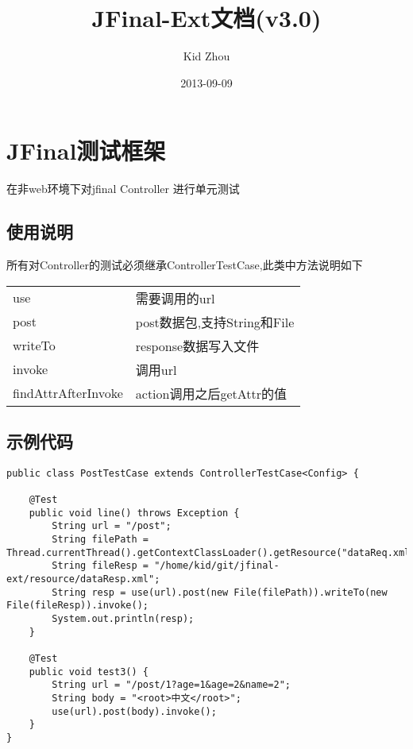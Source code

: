 \documentclass{scrartcl}
\title{JFinal-Ext文档(v3.0)}
\author{Kid Zhou}
\date{2013-09-09}
\begin{document}
\maketitle

\setcounter{tocdepth}{3}
\tableofcontents
\vspace*{1cm}

\section{JFinal测试框架}
\label{sec-1}

  在非web环境下对jfinal Controller 进行单元测试
\subsection{使用说明}
\label{sec-1-1}

 所有对Controller的测试必须继承ControllerTestCase,此类中方法说明如下

\begin{tabular}{ll}
 use                  &  需要调用的url                \\
 post                 &  post数据包,支持String和File  \\
 writeTo              &  response数据写入文件         \\
 invoke               &  调用url                      \\
 findAttrAfterInvoke  &  action调用之后getAttr的值    \\
\end{tabular}
\subsection{示例代码}
\label{sec-1-2}


\begin{verbatim}
public class PostTestCase extends ControllerTestCase<Config> {

    @Test
    public void line() throws Exception {
        String url = "/post";
        String filePath = Thread.currentThread().getContextClassLoader().getResource("dataReq.xml").getFile();
        String fileResp = "/home/kid/git/jfinal-ext/resource/dataResp.xml";
        String resp = use(url).post(new File(filePath)).writeTo(new File(fileResp)).invoke();
        System.out.println(resp);
    }

    @Test
    public void test3() {
        String url = "/post/1?age=1&age=2&name=2";
        String body = "<root>中文</root>";
        use(url).post(body).invoke();
    }
}
\end{verbatim}
    
\end{document}
